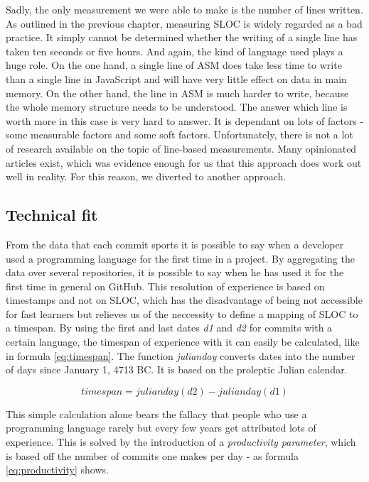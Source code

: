 Sadly, the only measurement we were able to make is the number of lines written.
As outlined in the previous chapter, measuring SLOC is widely regarded as a bad practice.
It simply cannot be determined whether the writing of a single line has taken
ten seconds or five hours. And again, the kind of language used plays a huge role.
On the one hand, a single line of ASM does take less time to write than a single line in JavaScript
and will have very little effect on data in main memory. On the other hand, the line
in ASM is much harder to write, because the whole memory structure needs to be understood.
The answer which line is worth more in this case is very hard to answer.
It is dependant on lots of factors - some measurable factors and some soft factors.
Unfortunately, there is not a lot of research available on the topic of line-based
measurements. Many opinionated articles exist, which was evidence enough for us
that this approach does work out well in reality. For this reason, we diverted to another approach.

\subsection{Technical fit}
From the data that each commit sports it is possible to say when a developer
used a programming language for the first time in a project.
By aggregating the data over several repositories, it is possible to say when
he has used it for the first time in general on GitHub.
This resolution of experience is based on timestamps and not on SLOC,
which has the disadvantage of being not accessible for fast learners
but relieves us of the neccessity to define a mapping of SLOC to a timespan.
By using the first and last dates \textit{d1} and \textit{d2} for commits
with a certain language, the timespan of experience with it can easily be
calculated, like in formula \ref{eq:timespan}. The function \textit{
julianday} converts dates into the number of days since January 1, 4713 BC.
It is based on the proleptic Julian calendar.

\begin{equation}
timespan = julianday(d2) - julianday(d1)
\label{eq:timespan}
\end{equation}

This simple calculation alone bears the fallacy that people who use a
programming language rarely but every few years get attributed lots
of experience. This is solved by the introduction of a \textit{productivity parameter},
which is based off the number of commits one makes per day - as formula \ref{eq:productivity} shows.

